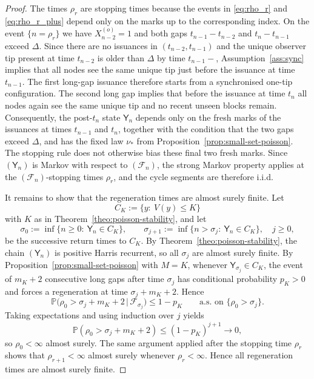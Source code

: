 \documentclass[a4paper,12pt,oneside,reqno]{amsart}
\renewcommand{\P}{{\mathbb P}}
\newcommand{\F}{{\mathcal F}}
\newcommand{\1}{{\mathbf 1}}
\begin{document}
\begin{proof}
The times $\rho_r$ are stopping times because the events in \eqref{eq:rho_r} and \eqref{eq:rho_r_plus} depend only on the marks up to the corresponding index. On the event $\{n=\rho_r\}$ we have $X_{n-2}^{(o)}=1$ and both gaps $t_{n-1}-t_{n-2}$ and $t_n-t_{n-1}$ exceed $\Delta$. Since there are no issuances in $(t_{n-2},t_{n-1})$ and the unique observer tip present at time $t_{n-2}$ is older than $\Delta$ by time $t_{n-1}-$, Assumption~\ref{ass:sync} implies that all nodes see the same unique tip just before the issuance at time $t_{n-1}$. The first long-gap issuance therefore starts from a synchronised one-tip configuration. The second long gap implies that before the issuance at time $t_n$ all nodes again see the same unique tip and no recent unseen blocks remain. Consequently, the post-$t_n$ state $\mathsf{Y}_n$ depends only on the fresh marks of the issuances at times $t_{n-1}$ and $t_n$, together with the condition that the two gaps exceed $\Delta$, and has the fixed law $\nu_\ast$ from Proposition~\ref{prop:small-set-poisson}. The stopping rule does not otherwise bias these final two fresh marks. Since $(\mathsf{Y}_n)$ is Markov with respect to $(\F_n)$, the strong Markov property applies at the $(\F_n)$-stopping times $\rho_r$, and the cycle segments are therefore i.i.d.

It remains to show that the regeneration times are almost surely finite. Let
\[
   C_K:=\{y:\ V(y)\le K\}
\]
with $K$ as in Theorem~\ref{theo:poisson-stability}, and let
\[
   \sigma_0:=\inf\{n\ge 0:\ \mathsf{Y}_n\in C_K\},\qquad
   \sigma_{j+1}:=\inf\{n>\sigma_j:\ \mathsf{Y}_n\in C_K\},\quad j\ge 0,
\]
be the successive return times to $C_K$. By Theorem~\ref{theo:poisson-stability}, the chain $(\mathsf{Y}_n)$ is positive Harris recurrent, so all $\sigma_j$ are almost surely finite. By Proposition~\ref{prop:small-set-poisson} with $M=K$, whenever $\mathsf{Y}_{\sigma_j}\in C_K$, the event of $m_K+2$ consecutive long gaps after time $\sigma_j$ has conditional probability $p_K>0$ and forces a regeneration at time $\sigma_j+m_K+2$. Hence
\[
   \P\bigl(\rho_0>\sigma_j+m_K+2 \,\big\vert\, \F_{\sigma_j}\bigr)\le 1-p_K
   \qquad\text{a.s.\ on }\{\rho_0>\sigma_j\}.
\]
Taking expectations and using induction over $j$ yields
\[
   \P(\rho_0>\sigma_j+m_K+2)\le (1-p_K)^{j+1}\longrightarrow 0,
\]
so $\rho_0<\infty$ almost surely. The same argument applied after the stopping time $\rho_r$ shows that $\rho_{r+1}<\infty$ almost surely whenever $\rho_r<\infty$. Hence all regeneration times are almost surely finite.
\end{proof}
\end{document}
